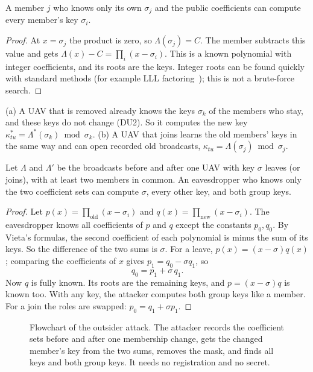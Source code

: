 \documentclass[11pt,openany]{report}
\begin{document}
\begin{theorem}\label{thm:insider}
A member $j$ who knows only its own $\sigma_j$ and the public coefficients can compute every member's key $\sigma_i$.
\end{theorem}
\begin{proof}
At $x=\sigma_j$ the product is zero, so $\Lambda(\sigma_j)=C$. The member subtracts this value and gets $\Lambda(x)-C=\prod_i(x-\sigma_i)$. This is a
known polynomial with integer coefficients, and its roots are the keys. Integer roots can be found quickly with standard methods (for example
LLL factoring~\cite{lll}); this is not a brute-force search.
\end{proof}

\begin{corollary}\label{cor:f2ab}
(a) A UAV that is removed already knows the keys $\sigma_k$ of the members who stay, and these keys do not change (DU2). So it computes the new key
$\kappa^*_{tu}=\Lambda^*(\sigma_k)\bmod\sigma_k$. (b) A UAV that joins learns the old members' keys in the same way and can open recorded old broadcasts,
$\kappa_{tu}=\Lambda(\sigma_j)\bmod\sigma_j$.
\end{corollary}

\begin{theorem}\label{thm:outsider}
Let $\Lambda$ and $\Lambda'$ be the broadcasts before and after one UAV with key $\sigma$ leaves (or joins), with at least two members in common. An
eavesdropper who knows only the two coefficient sets can compute $\sigma$, every other key, and both group keys.
\end{theorem}
\begin{proof}
Let $p(x)=\prod_{\text{old}}(x-\sigma_i)$ and $q(x)=\prod_{\text{new}}(x-\sigma_i)$. The eavesdropper knows all coefficients of $p$ and $q$ except the
constants $p_0,q_0$. By Vieta's formulas, the second coefficient of each polynomial is minus the sum of its keys. So the difference of the two sums is
$\sigma$. For a leave, $p(x)=(x-\sigma)q(x)$; comparing the coefficients of $x$ gives $p_1=q_0-\sigma q_1$, so
\[ q_0=p_1+\sigma\,q_1 . \]
Now $q$ is fully known. Its roots are the remaining keys, and $p=(x-\sigma)q$ is known too. With any key, the attacker computes both group keys like a
member. For a join the roles are swapped: $p_0=q_1+\sigma p_1$.
\end{proof}

\begin{figure}[H]
\centering

\caption{Flowchart of the outsider attack. The attacker records the coefficient sets before and after one membership change, gets the changed member's
key from the two sums, removes the mask, and finds all keys and both group keys. It needs no registration and no secret.}
\label{fig:outflow}
\end{figure}
\end{document}
